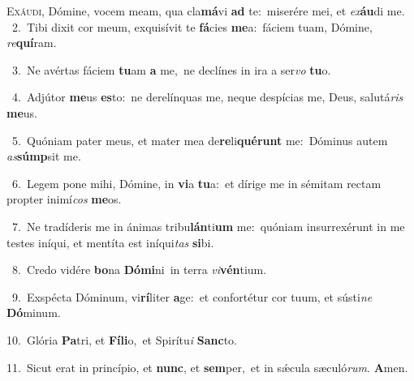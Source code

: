 \lettrine{\initial\textcolor{\initialcolor}{E}}{xáudi,} Dómine, vocem meam, qua cla\-\textbf{má}\-vi \textbf{ad} te:~\star miserére mei, et \textit{ex}\-\textbf{áu}di me.\\
{\numbfont\textcolor{\numbcolor}{~2.}}~Tibi dixit cor meum, exquisívit te \textbf{fá}\-cies \textbf{me}\-a:~\star fáciem tuam, Dómine, \textit{re}\-\textbf{quí}ram.\par
{\numbfont\textcolor{\numbcolor}{~3.}}~Ne avértas fáciem \textbf{tu}\-am \textbf{a} me,~\star ne declínes in ira a ser\textit{vo} \textbf{tu}\-o.\par
{\numbfont\textcolor{\numbcolor}{~4.}}~Adjútor \textbf{me}\-us \textbf{es}\-to:~\star ne derelínquas me, neque despícias me, Deus, salutá\textit{ris} \textbf{me}\-us.\par
{\numbfont\textcolor{\numbcolor}{~5.}}~Quóniam pater meus, et mater mea de\-\textbf{re}\-li\-\textbf{qué}\-\textbf{runt} me:~\star Dóminus autem \textit{as}\-\textbf{súmp}sit me.\par
{\numbfont\textcolor{\numbcolor}{~6.}}~Legem pone mihi, Dómine, in \textbf{vi}\-a \textbf{tu}\-a:~\star et dírige me in sémitam rectam propter inimí\textit{cos} \textbf{me}\-os.\par
{\numbfont\textcolor{\numbcolor}{~7.}}~Ne tradíderis me in ánimas tribu\-\textbf{lán}\-ti\textbf{um} me:~\star quóniam insurrexérunt in me testes iníqui, et mentíta est iníqui\textit{tas} \textbf{si}\-bi.\par
{\numbfont\textcolor{\numbcolor}{~8.}}~Credo vidére \textbf{bo}\-na \textbf{Dó}\-\textbf{mi}ni~\star in terra \textit{vi}\-\textbf{vén}tium.\par
{\numbfont\textcolor{\numbcolor}{~9.}}~Exspécta Dóminum, vi\-\textbf{rí}\-liter \textbf{a}\-ge:~\star et confortétur cor tuum, et sústi\textit{ne} \textbf{Dó}\-minum.\par
{\numbfont\textcolor{\numbcolor}{10.}}~Glória \textbf{Pa}\-tri, et \textbf{Fí}\-\textbf{li}o,~\star et Spirítu\textit{i} \textbf{Sanc}\-to.\par
{\numbfont\textcolor{\numbcolor}{11.}}~Sicut erat in princípio, et \textbf{nunc}\-, et \textbf{sem}\-per,~\star et in sǽcula sæculó\-\textit{rum}\-. \textbf{A}\-men.\par
